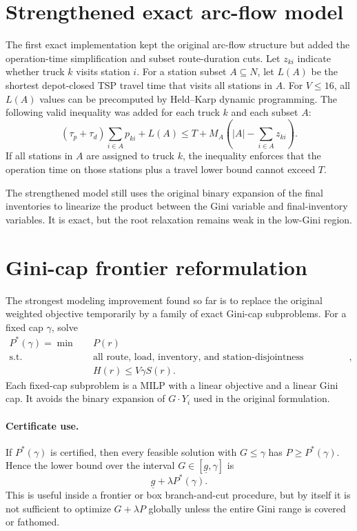 \documentclass[11pt]{article}
\begin{document}
\section{Strengthened exact arc-flow model}

The first exact implementation kept the original arc-flow structure but added the operation-time simplification and subset route-duration cuts.  Let $z_{ki}$ indicate whether truck $k$ visits station $i$.  For a station subset $A\subseteq N$, let $L(A)$ be the shortest depot-closed TSP travel time that visits all stations in $A$.  For $V\le 16$, all $L(A)$ values can be precomputed by Held--Karp dynamic programming.  The following valid inequality was added for each truck $k$ and each subset $A$:
\begin{equation}
    (\tau_p+\tau_d)\sum_{i\in A}p_{ki} + L(A)
    \le T + M_A\left(|A|-\sum_{i\in A}z_{ki}\right).
\end{equation}
If all stations in $A$ are assigned to truck $k$, the inequality enforces that the operation time on those stations plus a travel lower bound cannot exceed $T$.

The strengthened model still uses the original binary expansion of the final inventories to linearize the product between the Gini variable and final-inventory variables.  It is exact, but the root relaxation remains weak in the low-Gini region.

\section{Gini-cap frontier reformulation}

The strongest modeling improvement found so far is to replace the original weighted objective temporarily by a family of exact Gini-cap subproblems.  For a fixed cap $\gamma$, solve
\begin{align}
    P^*(\gamma)=\min \quad & P(r) \\
    \text{s.t.}\quad & \text{all route, load, inventory, and station-disjointness constraints},\\
    & H(r)\le V\gamma S(r).
\end{align}
Each fixed-cap subproblem is a MILP with a linear objective and a linear Gini cap.  It avoids the binary expansion of $G\cdot Y_i$ used in the original formulation.

\paragraph{Certificate use.}
If $P^*(\gamma)$ is certified, then every feasible solution with $G\le \gamma$ has $P\ge P^*(\gamma)$.  Hence the lower bound over the interval $G\in[\underline{g},\gamma]$ is
\begin{equation}
    \underline{g}+\lambda P^*(\gamma).
\end{equation}
This is useful inside a frontier or box branch-and-cut procedure, but by itself it is not sufficient to optimize $G+\lambda P$ globally unless the entire Gini range is covered or fathomed.
\end{document}
